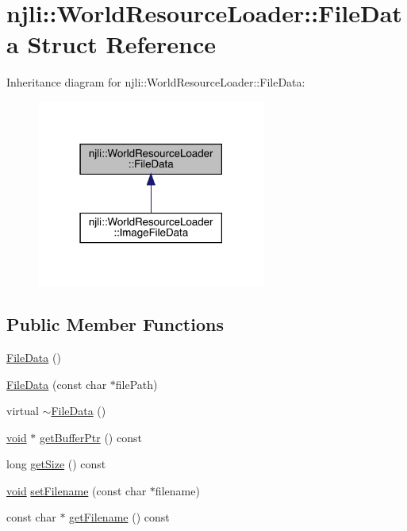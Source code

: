 \hypertarget{structnjli_1_1_world_resource_loader_1_1_file_data}{}\section{njli\+:\+:World\+Resource\+Loader\+:\+:File\+Data Struct Reference}
\label{structnjli_1_1_world_resource_loader_1_1_file_data}


Inheritance diagram for njli\+:\+:World\+Resource\+Loader\+:\+:File\+Data\+:\nopagebreak
\begin{figure}[H]
\begin{center}
\leavevmode
\includegraphics[width=214pt]{structnjli_1_1_world_resource_loader_1_1_file_data__inherit__graph}
\end{center}
\end{figure}
\subsection*{Public Member Functions}
\begin{DoxyCompactItemize}
\item 
\mbox{\hyperlink{structnjli_1_1_world_resource_loader_1_1_file_data_a0f3b18bc1de226c8554a86c1916713fc}{File\+Data}} ()
\item 
\mbox{\hyperlink{structnjli_1_1_world_resource_loader_1_1_file_data_ab6c34a0ff108e41856bbdb1b23841f3f}{File\+Data}} (const char $\ast$file\+Path)
\item 
virtual \mbox{\hyperlink{structnjli_1_1_world_resource_loader_1_1_file_data_a0c5cca1d8cfe27e9566edd0bcb4195ae}{$\sim$\+File\+Data}} ()
\item 
\mbox{\hyperlink{_thread_8h_af1e856da2e658414cb2456cb6f7ebc66}{void}} $\ast$ \mbox{\hyperlink{structnjli_1_1_world_resource_loader_1_1_file_data_a926e871f4bde97505b830c8daf0eeaf0}{get\+Buffer\+Ptr}} () const
\item 
long \mbox{\hyperlink{structnjli_1_1_world_resource_loader_1_1_file_data_ac1c19cfb7325292a4415e379f861654f}{get\+Size}} () const
\item 
\mbox{\hyperlink{_thread_8h_af1e856da2e658414cb2456cb6f7ebc66}{void}} \mbox{\hyperlink{structnjli_1_1_world_resource_loader_1_1_file_data_a8a534c2f997814047d00c824d1d1fd5b}{set\+Filename}} (const char $\ast$filename)
\item 
const char $\ast$ \mbox{\hyperlink{structnjli_1_1_world_resource_loader_1_1_file_data_a4dcf8d3fb37348db066416e6f5929263}{get\+Filename}} () const
\end{DoxyCompactItemize}
